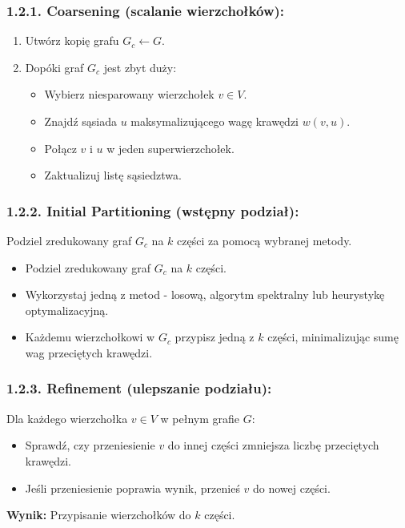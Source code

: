 \documentclass[]{article}
\begin{document}
\subsubsection{1.2.1. Coarsening (scalanie wierzchołków):}
\begin{enumerate}
    \item Utwórz kopię grafu $G_c \gets G$.
    \item Dopóki graf $G_c$ jest zbyt duży:
    \begin{itemize}
        \item Wybierz niesparowany wierzchołek $v \in V$.
        \item Znajdź sąsiada $u$ maksymalizującego wagę krawędzi $w(v, u)$.
        \item Połącz $v$ i $u$ w jeden superwierzchołek.
        \item Zaktualizuj listę sąsiedztwa.
    \end{itemize}
\end{enumerate}

\subsubsection{1.2.2. Initial Partitioning (wstępny podział):}
    Podziel zredukowany graf $G_c$ na $k$ części za pomocą wybranej metody.
\begin{itemize}
    \item Podziel zredukowany graf $G_c$ na $k$ części.
    \item Wykorzystaj jedną z metod - losową, algorytm spektralny lub heurystykę optymalizacyjną.
    \item Każdemu wierzchołkowi w $G_c$ przypisz jedną z $k$ części, minimalizując sumę wag przeciętych krawędzi.
\end{itemize}

\subsubsection{1.2.3. Refinement (ulepszanie podziału):}
    Dla każdego wierzchołka $v \in V$ w pełnym grafie $G$:
    \begin{itemize}
        \item Sprawdź, czy przeniesienie $v$ do innej części zmniejsza liczbę przeciętych krawędzi.
        \item Jeśli przeniesienie poprawia wynik, przenieś $v$ do nowej części.
    \end{itemize}

\textbf{Wynik:} Przypisanie wierzchołków do $k$ części.
\end{document}
